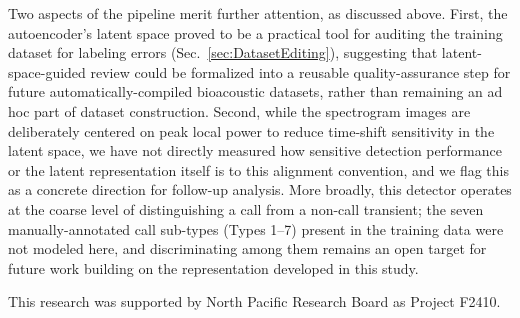 \documentclass[preprint,NumberedRefs]{JASAnew}
\begin{document}
Two aspects of the pipeline merit further attention, as discussed above.
First, the autoencoder's latent space proved to be a practical tool for
auditing the training dataset for labeling errors (Sec.~\ref{sec:DatasetEditing}),
suggesting that latent-space-guided review could be formalized into a
reusable quality-assurance step for future automatically-compiled bioacoustic
datasets, rather than remaining an ad hoc part of dataset construction.
Second, while the spectrogram images are deliberately centered on peak local
power to reduce time-shift sensitivity in the latent space, we have not
directly measured how sensitive detection performance or the latent
representation itself is to this alignment convention, and we flag this as a
concrete direction for follow-up analysis. More broadly, this detector
operates at the coarse level of distinguishing a call from a non-call
transient; the seven manually-annotated call sub-types (Types 1--7) present
in the training data were not modeled here, and discriminating among them
remains an open target for future work building on the representation
developed in this study.

\begin{acknowledgments}
This research was supported by  North Pacific Research Board as Project F2410. 
\end{acknowledgments}



\end{document}
